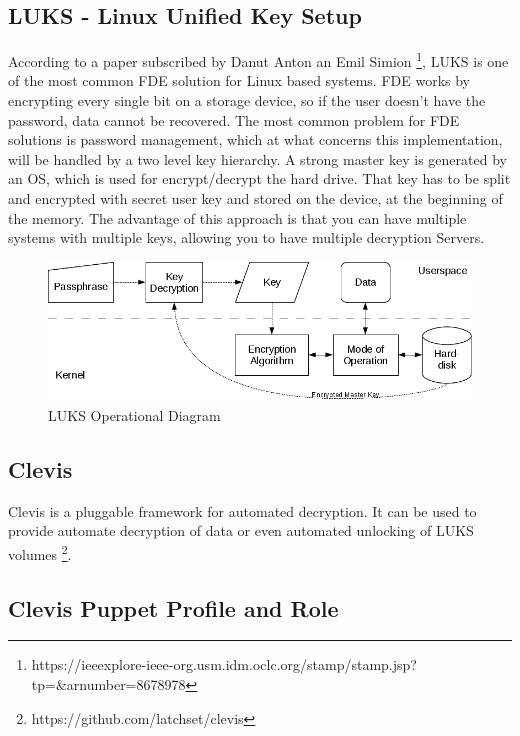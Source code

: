 \newpage
\subsection{LUKS - Linux Unified Key Setup}

According to a paper subscribed by Danut Anton an Emil Simion \footnote[1]{https://ieeexplore-ieee-org.usm.idm.oclc.org/stamp/stamp.jsp?tp=\&arnumber=8678978}, LUKS is one of the most common FDE solution for Linux based systems.
FDE works by encrypting every single bit on a storage device, so if the user doesn't have the password, data cannot be recovered. The most common problem for FDE solutions is password management, which at what concerns this implementation, will be handled by a two level key hierarchy. A strong master key is generated by an OS, which is used for encrypt/decrypt the hard drive. That key has to be split and encrypted with secret user key and stored on the device, at the beginning of the memory. The advantage of this approach is that you can have multiple systems with multiple keys, allowing you to have multiple decryption Servers.

\vskip 2cm
\begin{figure}
  \includegraphics[width=14cm]{images/image2.png}
  \centering
  \caption{LUKS Operational Diagram}
\end{figure}

\newpage
\subsection{Clevis}

Clevis is a pluggable framework for automated decryption. It can be used to provide automate decryption of data or even automated unlocking of LUKS volumes \footnote[2]{https://github.com/latchset/clevis}.

\subsection{Clevis Puppet Profile and Role}


\newpage
